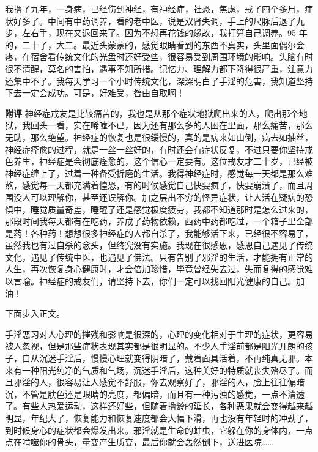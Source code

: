 \begin{case}
    我撸了九年，一身病，已经伤到神经，有神经症，社恐，焦虑，戒了四个多月，症状好多了。中间有中药调养，看的老中医，说是双肾失调，手上的尺脉后退了九步，左右手，现在又退回来了。因为不想再花钱的缘故，我打算自己调养。95 年的，二十了，大二。最近头蒙蒙的，感觉眼睛看到的东西不真实，头里面偶尔会疼，在宿舍看传统文化的光盘时还好受些，很容易受到周围环境的影响。头脑有时很不清醒，莫名的害怕，遇事不知所措。记忆力、理解力都下降得很严重，注意力还集中不了。我每天学习一个小时传统文化，深深明白了手淫的危害，我知道坚持下去一定会成功。可是，好难受，咎由自取啊！

    \textbf{附评} 神经症戒友是比较痛苦的，我也是从那个症状地狱爬出来的人，爬出那个地狱，我回头一看，实在唏嘘不已，因为还有那么多的人困在里面，那么痛苦，那么无助，那么绝望。神经症的恢复也是很缓慢的，真的是病来如山倒，病去如抽丝，神经症痊愈的过程，就是一丝一丝好的，有时还会有症状反复，不过只要你坚持戒色养生，神经症是会彻底痊愈的，这个信心一定要有。这位戒友才二十岁，已经被神经症缠上了，过着一种备受折磨的生活。我得神经症时，感觉每一天都是那么难熬，感觉每一天都充满着惶恐，有的时候感觉自己快要疯了，快要崩溃了，而且周围没人可以理解你，甚至还误解你。加之层出不穷的怪异症状，让人活在疑病的恐惧中，睡觉质量奇差，睡醒了还是感觉极度疲劳，我都不知道那时是怎么过来的，那段时间我每天都有在吃药，养成了药物依赖，西药中药都吃过，一个箱子里全部是药！各种药！想想很多神经症的人都自杀了，我能够活下来，已经很不容易了，虽然我也有过自杀的念头，但终究没有实施。我现在很感恩，感恩自己遇见了传统文化，遇见了传统中医，也遇见了佛法。只有告别了邪淫的生活，才能拥有正常的人生，再次恢复身心健康时，才会倍加珍惜，毕竟曾经失去过，失而复得的感觉难以言喻。神经症的戒友们，请坚持下去，你们一定可以找回阳光健康的自己。加油！
\end{case}

下面步入正文。

手淫恶习对人心理的摧残和影响是很深的，心理的变化相对于生理的症状，更容易被人忽视，但是那些症状表现其实都是很明显的。不少人手淫前都是阳光开朗的孩子，自从沉迷手淫后，慢慢心理就变得阴暗了，戴着面具活着，不再纯真无邪。本来有一种阳光纯净的气质和气场，沉迷手淫后，这种美好的特质就丧失殆尽了。而且邪淫的人，很容易让人感觉不舒服，你去观察好了，邪淫的人，脸上往往偏暗沉，不管是肤色还是眼睛的亮度，都偏暗，而且有一种污浊的感觉，一点不清透了。有些人热爱运动，这样还好些，但随着撸龄的延长，各种恶果就会变得越来越明显，年纪大了，恢复能力和恢复速度都会大幅下滑，再也没有年轻时的冲劲了，到时候身心的症状都会爆发出来。邪淫就是生命的蛀虫，它躲在你的身体内，一点点在啃噬你的骨头，量变产生质变，最后你就会轰然倒下，送进医院……

